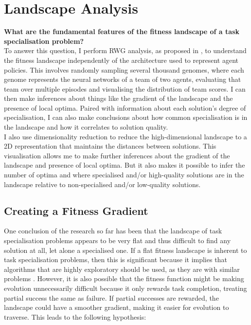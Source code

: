\documentclass[12pt]{article}
\begin{document}
\section{Landscape Analysis}\label{landscape_analysis}

\textbf{What are the fundamental features of the fitness landscape of a task specialisation problem?}\\

To answer this question, I perform RWG analysis, as proposed in \cite{oller:AAMAS:2020}, to understand the fitness landscape independently of the architecture used to represent agent policies.
This involves randomly sampling several thousand genomes, where each genome represents the neural networks of a team of two agents, evaluating that team over multiple episodes and visualising the distribution of team scores. 
I can then make inferences about things like the gradient of the landscape and the presence of local optima.
Paired with information about each solution's degree of specialisation, I can also make conclusions about how common specialisation is in the landscape and how it correlates to solution quality.\\

I also use dimensionality reduction to reduce the high-dimensional landscape to a 2D representation that maintains the distances between solutions.
This visualisation allows me to make further inferences about the gradient of the landscape and presence of local optima.
But it also makes it possible to infer the number of optima and where specialised and/or high-quality solutions are in the landscape relative to non-specialised and/or low-quality solutions.\\

\subsection{Creating a Fitness Gradient}

One conclusion of the research so far has been that the landscape of task specialisation problems appears to be very flat and thus difficult to find any solution at all, let alone a specialised one.
If a flat fitness landscape is inherent to task specialisation problems, then this is significant because it implies that algorithms that are highly exploratory should be used, as they are with similar problems \cite{oller:AAMAS:2020}.
However, it is also possible that the fitness function might be making evolution unnecessarily difficult because it only rewards task completion, treating partial success the same as failure.
If partial successes are rewarded, the landscape could have a smoother gradient, making it easier for evolution to traverse.
This leads to the following hypothesis:\\
\end{document}
